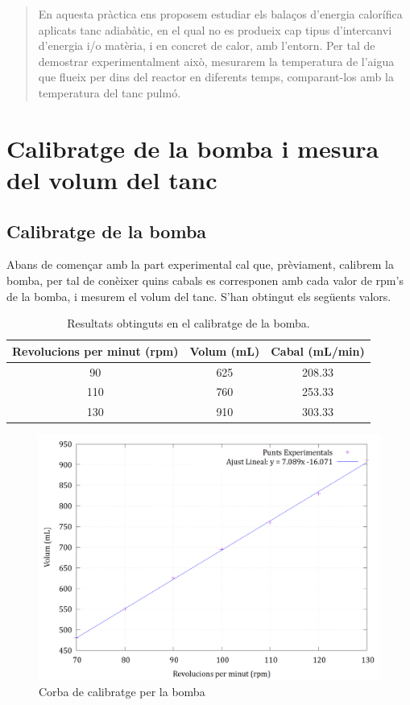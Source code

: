 \documentclass[10pt, twoside]{article}
\begin{document}
\begin{abstract}
En aquesta pràctica ens proposem estudiar els balaços d'energia calorífica aplicats tanc adiabàtic, en el qual no es produeix cap tipus d'intercanvi d'energia i/o matèria, i en concret de calor, amb l'entorn.  Per tal de demostrar experimentalment això, mesurarem la temperatura de l'aigua que flueix per dins del reactor en diferents temps, comparant-los amb la temperatura del tanc pulmó.
\end{abstract}

\section{Calibratge de la bomba i mesura del volum del tanc}
\subsection{Calibratge de la bomba}
Abans de començar amb la part experimental cal que, prèviament, calibrem la bomba, per tal de conèixer quins cabals es corresponen amb cada valor de rpm's de la bomba, i mesurem el volum del tanc. S'han obtingut els següents valors.
\begin{table}[h!]
    \centering
    \caption{Resultats obtinguts en el calibratge de la bomba.}
    \label{tab1}
    \begin{tabular}{|c|c|c|} %
    \hline
    Revolucions per minut (rpm) & Volum (mL) & Cabal (mL/min) \\ \hline
    90       & 625       & 208.33       \\ \hline
    110      & 760       & 253.33       \\ \hline
    130      & 910       & 303.33       \\ \hline
    \end{tabular}
\end{table}
 
\begin{figure}[h]
    \centering
    \includegraphics[width=0.7\linewidth]{calbombagnu.png}
    \caption{Corba de calibratge per la bomba}
    \label{fig1}
\end{figure}
 
\end{document}
